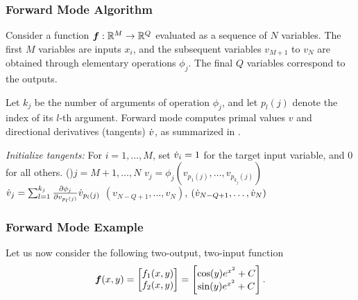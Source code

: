 \subsubsection{Forward Mode Algorithm}

Consider a function $\boldsymbol{f}: \mathbb{R}^M \rightarrow \mathbb{R}^Q$ evaluated as a sequence of $N$ variables. The first $M$ variables are inputs $x_i$, and the subsequent variables $v_{M+1}$ to $v_N$ are obtained through elementary operations $\phi_j$. The final $Q$ variables correspond to the outputs.

Let $k_j$ be the number of arguments of operation $\phi_j$, and let $p_l(j)$ denote the index of its $l$-th argument. Forward mode computes primal values $v$ and directional derivatives (tangents) $\dot{v}$, as summarized in .

\begin{algorithm}
  \caption{Forward mode \gls{ad}.}
  \label{alg:forward-mode}
  \DontPrintSemicolon
  \emph{Initialize tangents:} For $i = 1, \ldots, M$, set $\dot{v}_i = 1$ for the target input variable, and $0$ for all others.\;
  \For(){$j = M+1, \ldots, N$}{
    $v_j = \phi_j(v_{p_1(j)}, \ldots, v_{p_{k_j}(j)})$\;
    $\dot{v}_j = \sum_{l=1}^{k_j} \frac{\partial \phi_j}{\partial v_{p_l(j)}} \dot{v}_{p_l(j)}$ \;
  }
  \KwRet $(v_{N-Q+1}, \ldots, v_N)$, $(\dot{v}_{N-Q+1}, \ldots, \dot{v}_N)$\;
\end{algorithm}

\subsubsection{Forward Mode Example}

Let us now consider the following two-output, two-input function
\begin{equation}\label{eq:ad-example-function}
  \boldsymbol{f}(x,y) =
  \begin{bmatrix}f_{1}(x,y)\\ f_{2}(x,y)
  \end{bmatrix} =
  \begin{bmatrix} \cos(y) e^{x^2} + C\\ \sin(y) e^{x^2} + C
  \end{bmatrix}.
\end{equation}

